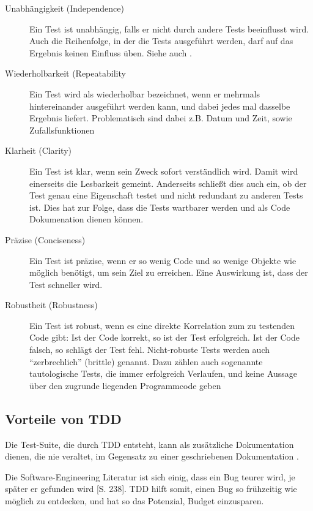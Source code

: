 \begin{description}
 \item[Unabhängigkeit (Independence)] Ein Test ist unabhängig, falls er nicht durch andere Tests beeinflusst wird. Auch die Reihenfolge, in der die Tests ausgeführt werden, darf auf das Ergebnis keinen Einfluss üben. Siehe auch \citep{beck_test_2002}.
 \item[Wiederholbarkeit (Repeatability] Ein Test wird als wiederholbar bezeichnet, wenn er mehrmals hintereinander ausgeführt werden kann, und dabei jedes mal dasselbe Ergebnis liefert. Problematisch sind dabei z.B. Datum und Zeit, sowie Zufallsfunktionen
 \item[Klarheit (Clarity)] Ein Test ist klar, wenn sein Zweck sofort verständlich wird. Damit wird einerseits die Lesbarkeit gemeint. Anderseits schließt dies auch ein, ob der Test genau eine Eigenschaft testet und nicht redundant zu anderen Tests ist. Dies hat zur Folge, dass die Tests wartbarer werden und als Code Dokumenation dienen können.
 \item[Präzise (Conciseness)] Ein Test ist präzise, wenn er so wenig Code und so wenige Objekte wie möglich benötigt, um sein Ziel zu erreichen. Eine Auswirkung ist, dass der Test schneller wird.
 \item[Robustheit (Robustness)] Ein Test ist robust, wenn es eine direkte Korrelation zum zu testenden Code gibt: Ist der Code korrekt, so ist der Test erfolgreich. Ist der Code falsch, so schlägt der Test fehl. Nicht-robuste Tests werden auch "`zerbrechlich"' (brittle) genannt. Dazu zählen auch sogenannte tautologische Tests, die immer erfolgreich Verlaufen, und keine Aussage über den zugrunde liegenden Programmcode geben
 \end{description}


  
  \subsection{Vorteile von TDD}
   
  Die Test-Suite, die durch TDD entsteht, kann als zusätzliche Dokumentation dienen, die nie veraltet, im Gegensatz zu einer geschriebenen Dokumentation \citep{palermo_guidelines_2006}.
  
  Die Software-Engineering Literatur ist sich einig, dass ein Bug teurer wird, je später er gefunden wird \citep{hunt_pragmatic_1999}[S. 238]. TDD hilft somit, einen Bug so frühzeitig wie möglich zu entdecken, und hat so das Potenzial, Budget einzusparen.
  
